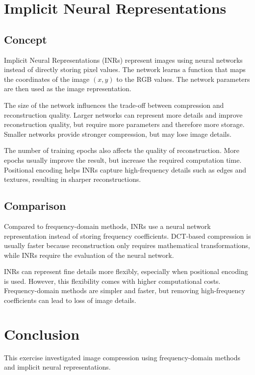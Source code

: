 \section{Implicit Neural Representations}

\subsection{Concept}

Implicit Neural Representations (INRs) represent images using neural networks instead of directly storing pixel values. The network learns a function that maps the coordinates of the image $(x,y)$ to the RGB values. The network parameters are then used as the image representation.

The size of the network influences the trade-off between compression and reconstruction quality. Larger networks can represent more details and improve reconstruction quality, but require more parameters and therefore more storage. Smaller networks provide stronger compression, but may lose image details.

The number of training epochs also affects the quality of reconstruction. More epochs usually improve the result, but increase the required computation time. Positional encoding helps INRs capture high-frequency details such as edges and textures, resulting in sharper reconstructions.

\subsection{Comparison}

Compared to frequency-domain methods, INRs use a neural network representation instead of storing frequency coefficients. DCT-based compression is usually faster because reconstruction only requires mathematical transformations, while INRs require the evaluation of the neural network.

INRs can represent fine details more flexibly, especially when positional encoding is used. However, this flexibility comes with higher computational costs. Frequency-domain methods are simpler and faster, but removing high-frequency coefficients can lead to loss of image details.


\section{Conclusion}

This exercise investigated image compression using frequency-domain methods and implicit neural representations.

